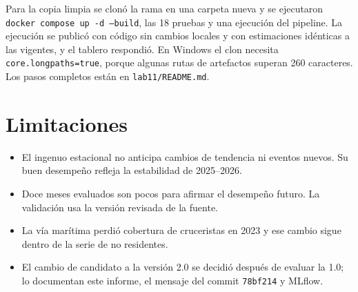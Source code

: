 \documentclass[11pt,letterpaper]{article}
\newcommand{\run}[1]{\texttt{#1}}
\begin{document}
Para la copia limpia se clonó la rama en una carpeta nueva y se ejecutaron \texttt{docker compose up -d --build}, las 18 pruebas y una ejecución del pipeline. La ejecución se publicó con código sin cambios locales y con estimaciones idénticas a las vigentes, y el tablero respondió. En Windows el clon necesita \texttt{core.longpaths=true}, porque algunas rutas de artefactos superan 260 caracteres. Los pasos completos están en \texttt{lab11/README.md}.

\section{Limitaciones}

\begin{itemize}
\item El ingenuo estacional no anticipa cambios de tendencia ni eventos nuevos. Su buen desempeño refleja la estabilidad de 2025--2026.
\item Doce meses evaluados son pocos para afirmar el desempeño futuro. La validación usa la versión revisada de la fuente.
\item La vía marítima perdió cobertura de cruceristas en 2023 y ese cambio sigue dentro de la serie de no residentes.
\item El cambio de candidato a la versión 2.0 se decidió después de evaluar la 1.0; lo documentan este informe, el mensaje del commit \run{78bf214} y MLflow.
\end{itemize}
\end{document}
